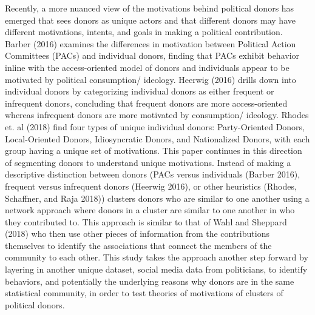 \documentclass[12pt,]{article}
\begin{document}
Recently, a more nuanced view of the motivations behind political donors
has emerged that sees donors as unique actors and that different donors
may have different motivations, intents, and goals in making a political
contribution. Barber (2016) examines the differences in motivation
between Political Action Committees (PACs) and individual donors,
finding that PACs exhibit behavior inline with the access-oriented model
of donors and individuals appear to be motivated by political
consumption/ ideology. Heerwig (2016) drills down into individual donors
by categorizing individual donors as either frequent or infrequent
donors, concluding that frequent donors are more access-oriented whereas
infrequent donors are more motivated by consumption/ ideology. Rhodes
et. al (2018) find four types of unique individual donors:
Party-Oriented Donors, Local-Oriented Donors, Idiosyncratic Donors, and
Nationalized Donors, with each group having a unique set of motivations.
This paper continues in this direction of segmenting donors to
understand unique motivations. Instead of making a descriptive
distinction between donors (PACs versus individuals (Barber 2016),
frequent versus infrequent donors (Heerwig 2016), or other heuristics
(Rhodes, Schaffner, and Raja 2018)) clusters donors who are similar to
one another using a network approach where donors in a cluster are
similar to one another in who they contributed to. This approach is
similar to that of Wahl and Sheppard (2018) who then use other pieces of
information from the contributions themselves to identify the
associations that connect the members of the community to each other.
This study takes the approach another step forward by layering in
another unique dataset, social media data from politicians, to identify
behaviors, and potentially the underlying reasons why donors are in the
same statistical community, in order to test theories of motivations of
clusters of political donors.
\end{document}
